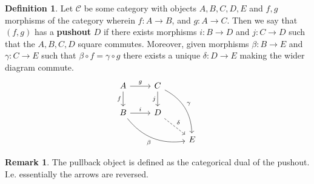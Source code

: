 \documentclass[12pt]{book}
\theoremstyle{definition}
\newtheorem{definition}[theorem]{Definition}
\newtheorem{remark}[theorem]{Remark}
\begin{document}
\begin{definition}
    Let $\mathcal{C}$ be some category with objects $A,B,C,D,E$ and $f,g$ morphisms of the category wherein $f: A \to B$, and $g:A \to C$. Then we say that $(f,g)$ has a \textbf{pushout} $D$ if there exists morphisms $i : B \to D$ and $j : C \to D$ such that the $A, B, C, D$ square commutes. Moreover, given morphisms $\beta : B \to E$ and $\gamma : C \to E$ such that $\beta \circ f = \gamma \circ g$ there exists a unique $\delta : D \to E$ making the wider diagram commute. 
    \[
    \begin{tikzcd}
    A \arrow[d,"f"'] \arrow[r,"g"] &
    C \arrow[d,"j"'] \arrow[ddr,bend left,"\gamma"] \\
    B \arrow[r,"i"] \arrow[drr,bend right,"\beta"'] &
    D \arrow[dr,dashed,"\delta"] \\
    && E
    \end{tikzcd}
    \]
\end{definition}

\begin{remark}
    The pullback object is defined as the categorical dual of the pushout. I.e. essentially the arrows are reversed. 
\end{remark}
\end{document}
